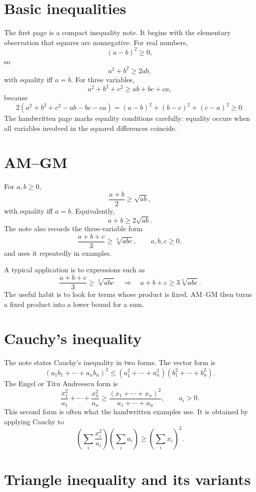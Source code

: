 
\section{Basic inequalities}

The first page is a compact inequality note.  It begins with the elementary observation that squares are nonnegative.  For real numbers,
\[
  (a-b)^2\ge0,
\]
so
\[
  a^2+b^2\ge2ab,
\]
with equality iff $a=b$.  For three variables,
\[
  a^2+b^2+c^2\ge ab+bc+ca,
\]
because
\[
  2(a^2+b^2+c^2-ab-bc-ca)=(a-b)^2+(b-c)^2+(c-a)^2\ge0.
\]
The handwritten page marks equality conditions carefully: equality occurs when all variables involved in the squared differences coincide.

\section{AM--GM}

For $a,b\ge0$,
\[
  \frac{a+b}{2}\ge\sqrt{ab},
\]
with equality iff $a=b$.  Equivalently,
\[
  a+b\ge2\sqrt{ab}.
\]
The note also records the three-variable form
\[
  \frac{a+b+c}{3}\ge\sqrt[3]{abc},\qquad a,b,c\ge0,
\]
and uses it repeatedly in examples.

A typical application is to expressions such as
\[
  \frac{a+b+c}{3}\ge\sqrt[3]{abc}
  \quad\Longrightarrow\quad
  a+b+c\ge3\sqrt[3]{abc}.
\]
The useful habit is to look for terms whose product is fixed.  AM--GM then turns a fixed product into a lower bound for a sum.

\section{Cauchy's inequality}

The note states Cauchy's inequality in two forms.  The vector form is
\[
  (a_1b_1+\cdots+a_nb_n)^2
  \le
  (a_1^2+\cdots+a_n^2)(b_1^2+\cdots+b_n^2).
\]
The Engel or Titu Andreescu form is
\[
  \frac{x_1^2}{a_1}+\cdots+\frac{x_n^2}{a_n}
  \ge
  \frac{(x_1+\cdots+x_n)^2}{a_1+\cdots+a_n},\qquad a_i>0.
\]
This second form is often what the handwritten examples use.  It is obtained by applying Cauchy to
\[
  \left(\sum_i \frac{x_i^2}{a_i}\right)
  \left(\sum_i a_i\right)
  \ge
  \left(\sum_i x_i\right)^2.
\]

\section{Triangle inequality and its variants}

